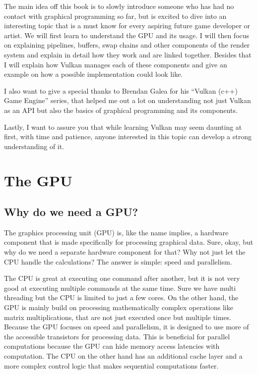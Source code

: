 \documentclass[12pt]{report} \usepackage{preamble}
\begin{document}
The main idea off this book is to slowly introduce someone who has had
no contact with graphical programming so far, but is excited to dive
into an interesting topic that is a must know for every aspiring future
game developer or artist. We will first learn to understand the GPU and
its usage. I will then focus on explaining pipelines, buffers, swap chains
and other components of the render system and explain in detail how they work
and are linked together. Besides that I will explain how Vulkan manages
each of these components and give an example on how a possible implementation
could look like.

I also want to give a special thanks to Brendan Galea for his “Vulkan
(c++) Game Engine” series, that helped me out a lot on understanding
not just Vulkan as an API but also the basics of graphical programming
and its components.

Lastly, I want to assure you that while learning Vulkan may seem daunting
at first, with time and patience, anyone interested in this topic can
develop a strong understanding of it.

\chapter{The GPU}

\section{Why do we need a GPU?}

The graphics processing unit (GPU) is, like the name implies, a hardware
component that is made specifically for processing graphical data. Sure,
okay, but why do we need a separate hardware component for that?  Why not
just let the CPU handle the calculations? The answer is simple: speed
and parallelism.

The CPU is great at executing one command after another, but
it is not very good at executing multiple commands at the same
time. Sure we have multi threading but the CPU is limited to just a
few cores. \cite{CDW-cpu_vs_gpu} On the other hand, the GPU is mainly
build on processing mathematically complex operations like matrix
multiplications, that are not just executed once but multiple
times. \cite{NVIDIA-cpu-gpu} Because the GPU focuses on speed
and parallelism, it is designed to use more of the accessible
transistors for processing data. This is beneficial for parallel
computations because the GPU can hide memory access latencies with
computation. The CPU on the other hand has an additional cache layer
and a more complex control logic that makes sequential computations
faster. \cite{CUDA_Programming_Guide}
\end{document}
